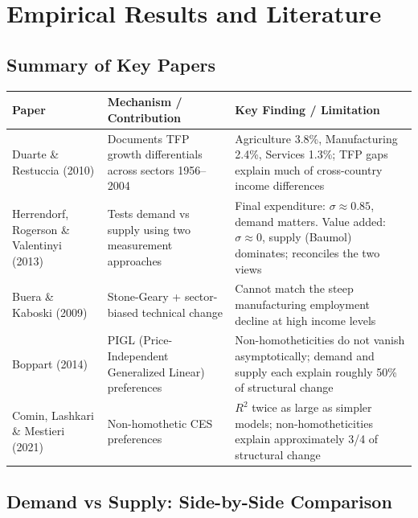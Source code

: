 \documentclass[a4paper,11pt]{article}
\begin{document}
\clearpage

\section{Empirical Results and Literature}

\subsection*{Summary of Key Papers}

\begin{center}
\begin{tabular}{p{3.5cm}p{5cm}p{5.5cm}}
\toprule
\textbf{Paper} & \textbf{Mechanism / Contribution} & \textbf{Key Finding / Limitation} \\
\midrule
Duarte \& Restuccia (2010) & Documents TFP growth differentials across sectors 1956--2004 & Agriculture 3.8\%, Manufacturing 2.4\%, Services 1.3\%; TFP gaps explain much of cross-country income differences \\[0.5em]
Herrendorf, Rogerson \& Valentinyi (2013) & Tests demand vs supply using two measurement approaches & Final expenditure: $\sigma \approx 0.85$, demand matters. Value added: $\sigma \approx 0$, supply (Baumol) dominates; reconciles the two views \\[0.5em]
Buera \& Kaboski (2009) & Stone-Geary + sector-biased technical change & Cannot match the steep manufacturing employment decline at high income levels \\[0.5em]
Boppart (2014) & PIGL (Price-Independent Generalized Linear) preferences & Non-homotheticities do not vanish asymptotically; demand and supply each explain roughly 50\% of structural change \\[0.5em]
Comin, Lashkari \& Mestieri (2021) & Non-homothetic CES preferences & $R^2$ twice as large as simpler models; non-homotheticities explain approximately 3/4 of structural change \\
\bottomrule
\end{tabular}
\end{center}

\subsection*{Demand vs Supply: Side-by-Side Comparison}
\end{document}
